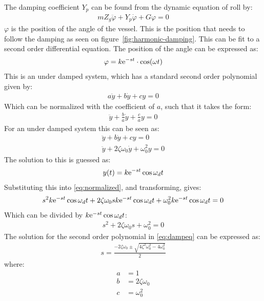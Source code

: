 The damping coefficient $Y_p$ can be found from the dynamic equation of roll by:
\begin{align}
mZ_g\ddot \varphi + Y_p\dot \varphi + G\varphi = 0
\label{eq:solveddyneq}
\end{align}
$\varphi$ is the position of the angle of the vessel. This is the position that needs to follow the damping as seen on figure~\vref{fig:harmonic-damping}. This can be fit to a second order differential equation. The position of the angle can be expressed as:
\begin{align}
\varphi = k\mathrm{e}^{-st} \cdot \cos(\omega t)
\end{align}
This is an under damped system, which has a standard second order polynomial given by:
\begin{align}
a\ddot y + b\dot y + cy = 0
\end{align}
Which can be normalized with the coefficient of $a$, such that it takes the form:
\begin{align}
\ddot y + \frac{b}{a}\dot y + \frac{c}{a}y = 0
\label{eq:parameterized}
\end{align}
For an under damped system this can be seen as:
\begin{align}
\ddot y + b\dot y + cy = 0\\
\ddot y + 2\zeta \omega_0 \dot y + \omega_0^2 y = 0
\label{eq:normalized}
\end{align}
The solution to this is guessed as:
\begin{align}
y(t) = k\mathrm{e}^{-st} \cos{\omega_dt}
\label{eq:solutionguess}
\end{align}
Substituting this into \ref{eq:normalized}, and transforming, gives:
\begin{align}
s^2k\mathrm{e}^{-st} \cos{\omega_dt} + 2\zeta \omega_0sk\mathrm{e}^{-st} \cos{\omega_dt} + \omega_0^2k\mathrm{e}^{-st} \cos{\omega_dt} = 0
\end{align}
Which can be divided by $k\mathrm{e}^{-st} \cos{\omega_dt}$:
\begin{align}
s^2 + 2\zeta \omega_0s + \omega_0^2 = 0
\label{eq:dampeq}
\end{align}
The solution for the second order polynomial in \ref{eq:dampeq} can be expressed as:
\begin{align}
s = \frac{-2\zeta \omega_0 \pm \sqrt{4\zeta^2\omega_0^2-4\omega_0^2}}{2}
\end{align}
where:
\begin{align}
a &= 1\\
b &= 2\zeta \omega_0\\
c &= \omega_0^2
\end{align}
